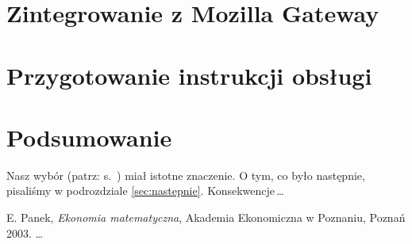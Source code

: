 \documentclass[12pt]{report}
\begin{document}
 \chapter{Zintegrowanie z Mozilla Gateway}
 
 \chapter{Przygotowanie instrukcji obsługi}
 
 

 \chapter*{Podsumowanie}

 Nasz wybór (patrz: s.~\pageref{sec:wybor}) miał istotne znaczenie.
 O tym, co było następnie, pisaliśmy w podrozdziale \ref{sec:nastepnie}.
 Konsekwencje\,\ldots

 \begin{thebibliography}{9}
 E. Panek, \emph{Ekonomia matematyczna}, Akademia Ekonomiczna w Poznaniu,
 Poznań 2003.
 \ldots
 
 \end{thebibliography}

 
\end{document}
